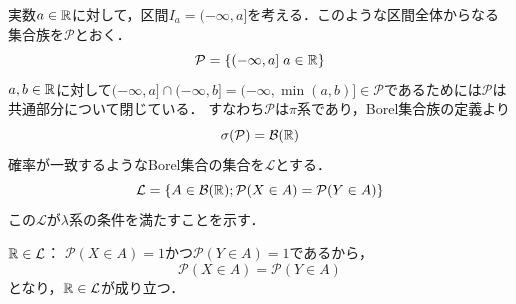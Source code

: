 \documentclass[dvipdfmx, leqno]{jsbook}
\begin{document}
\begin{souanswer}
	実数$a\in \mathbb{R}$に対して，区間$I_a= (-\infty, a]$を考える．このような区間全体からなる集合族を$\mathcal{P}$とおく．
\begin{equation}
	\mathcal{P}= \{(-\infty, a]\; a\in \mathbb{R}\}
\end{equation}
	$a, b\in\mathbb{R}$に対して$(-\infty, a]\cap (-\infty, b]= (-\infty, \min{(a, b)}]\in \mathcal{P}$であるためには$\mathcal{P}$は共通部分について閉じている．
	すなわち$\mathcal{P}$は$\pi$系であり，Borel集合族の定義より
\begin{equation}
	\sigma(\mathcal{P})= \mathcal{B}(\mathbb{R})
\end{equation}
	確率が一致するようなBorel集合の集合を$\mathcal{L}$とする．
\begin{equation}
	\mathcal{L}= \{A\in \mathcal{B}(\mathbb{R}); \mathcal{P}(X\in A)= \mathcal{P}(Y\in A)\}
\end{equation}
	この$\mathcal{L}$が$\lambda$系の条件を満たすことを示す．
\begin{enumerate_alpha}
	\item $\mathbb{R}\in \mathcal{L}$：
	$\mathcal{P}(X\in A)= 1$かつ$\mathcal{P}(Y\in A)= 1$であるから，
\begin{equation}
	\mathcal{P}(X\in A)= \mathcal{P}(Y\in A)
\end{equation}
	となり，$\mathbb{R}\in \mathcal{L}$が成り立つ．


\end{enumerate_alpha}
\end{souanswer}
\end{document}
